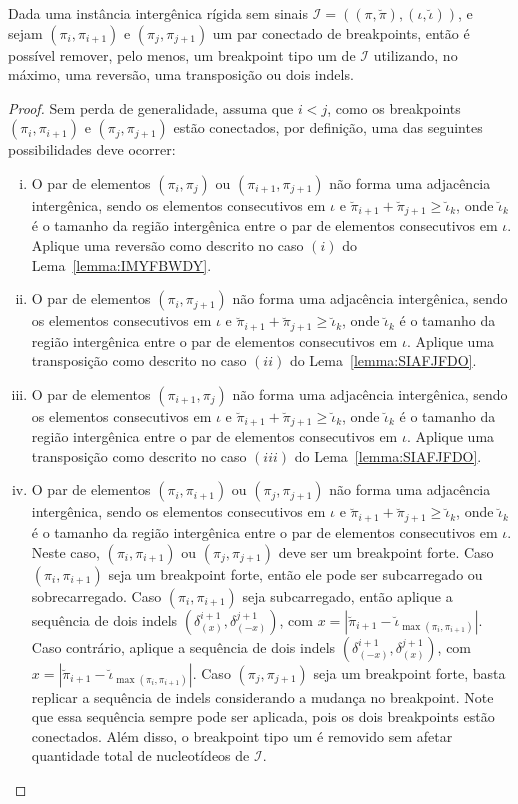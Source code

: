\begin{lemma}\label{lemma:XLFWKWTV}
Dada uma instância intergênica rígida sem sinais $\mathcal{I}=((\pi,\breve\pi),(\iota,\breve\iota))$, e sejam $(\pi_i,\pi_{i+1})$ e $(\pi_j,\pi_{j+1})$ um par conectado de breakpoints, então é possível remover, pelo menos, um breakpoint tipo um de $\mathcal{I}$ utilizando, no máximo, uma reversão, uma transposição ou dois indels.
\end{lemma}
\begin{proof}
Sem perda de generalidade, assuma que $i < j$, como os breakpoints $(\pi_i,\pi_{i+1})$ e $(\pi_j,\pi_{j+1})$ estão conectados, por definição, uma das seguintes possibilidades deve ocorrer:
\begin{enumerate}[i.]
  \item O par de elementos $(\pi_i,\pi_{j})$ ou $(\pi_{i+1},\pi_{j+1})$ não forma uma adjacência intergênica, sendo os elementos consecutivos em $\iota$ e $\breve\pi_{i+1} + \breve\pi_{j+1} \ge \breve\iota_k$, onde $\breve\iota_k$ é o tamanho da região intergênica entre o par de elementos consecutivos em $\iota$. Aplique uma reversão como descrito no caso $(i)$ do Lema~\ref{lemma:IMYFBWDY}.
  \item O par de elementos $(\pi_i,\pi_{j+1})$ não forma uma adjacência intergênica, sendo os elementos consecutivos em $\iota$ e $\breve\pi_{i+1} + \breve\pi_{j+1} \ge \breve\iota_k$, onde $\breve\iota_k$ é o tamanho da região intergênica entre o par de elementos consecutivos em $\iota$. Aplique uma transposição como descrito no caso $(ii)$ do Lema~\ref{lemma:SIAFJFDO}.
  \item O par de elementos $(\pi_{i+1},\pi_{j})$ não forma uma adjacência intergênica, sendo os elementos consecutivos em $\iota$ e $\breve\pi_{i+1} + \breve\pi_{j+1} \ge \breve\iota_k$, onde $\breve\iota_k$ é o tamanho da região intergênica entre o par de elementos consecutivos em $\iota$. Aplique uma transposição como descrito no caso $(iii)$ do Lema~\ref{lemma:SIAFJFDO}.
  \item O par de elementos $(\pi_{i},\pi_{i+1})$ ou $(\pi_{j},\pi_{j+1})$ não forma uma adjacência intergênica, sendo os elementos consecutivos em $\iota$ e $\breve\pi_{i+1} + \breve\pi_{j+1} \ge \breve\iota_k$, onde $\breve\iota_k$ é o tamanho da região intergênica entre o par de elementos consecutivos em $\iota$. Neste caso, $(\pi_{i},\pi_{i+1})$ ou $(\pi_{j},\pi_{j+1})$ deve ser um breakpoint forte. Caso $(\pi_{i},\pi_{i+1})$ seja um breakpoint forte, então ele pode ser subcarregado ou sobrecarregado. Caso $(\pi_{i},\pi_{i+1})$ seja subcarregado, então aplique a sequência de dois indels $(\delta^{i+1}_{(x)}, \delta^{j+1}_{(-x)})$, com $x=|\breve\pi_{i+1} - \breve\iota_{\max(\pi_i, \pi_{i+1})}|$. Caso contrário, aplique a sequência de dois indels $(\delta^{i+1}_{(-x)}, \delta^{j+1}_{(x)})$, com $x=|\breve\pi_{i+1} - \breve\iota_{\max(\pi_i, \pi_{i+1})}|$. Caso $(\pi_{j},\pi_{j+1})$ seja um breakpoint forte, basta replicar a sequência de indels considerando a mudança no breakpoint. Note que essa sequência sempre pode ser aplicada, pois os dois breakpoints estão conectados. Além disso, o breakpoint tipo um é removido sem afetar quantidade total de nucleotídeos de $\mathcal{I}$.  

\end{enumerate}
\end{proof}
